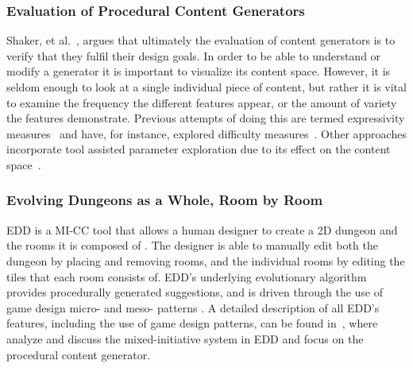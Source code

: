 \subsubsection{Evaluation of Procedural Content Generators}
Shaker, et al.~\cite{p6shaker_procedural_2016}, argues that ultimately the evaluation of content generators is to verify that they fulfil their design goals. In order to be able to understand or modify a generator it is important to visualize its content space. However, it is seldom enough to look at a single individual piece of content, but rather it is vital to examine the frequency the different features appear, or the amount of variety the features demonstrate. Previous attempts of doing this are termed expressivity measures~\cite{p6Smith:2010:Expressive-range,Summerville2018-ExpresiveRange} and have, for instance, explored difficulty measures~\cite{p6Horn2014-comparativePCG}. Other approaches incorporate tool assisted parameter exploration due to its effect on the content space~\cite{p6Cook2016-danesh,Cook2019:ParameterBasedEvaluation}.


\subsubsection{Evolving Dungeons as a Whole, Room by Room}


EDD is a MI-CC tool that allows a human designer to create a 2D dungeon and the rooms it is composed of%
. The designer is able to manually edit both the dungeon by placing and removing rooms, and the individual rooms by  editing the tiles %
that each room consists of. EDD's underlying evolutionary algorithm provides procedurally generated suggestions, and is driven through the use of game design micro- and meso- patterns%
. A detailed description of all EDD's features, including the use of game design patterns, can be found in~\cite{p6Baldwin2017a, Baldwin2017, Alvarez2018, Alvarez2018a}, where \cite{p6Alvarez2018,Baldwin2017} analyze and discuss the mixed-initiative system in EDD and \cite{p6Baldwin2017a,Alvarez2018a} focus on the procedural content generator.

